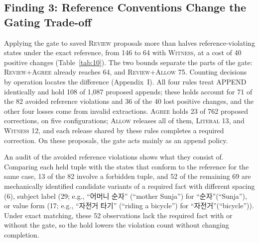 \documentclass[acmsmall,review,anonymous]{acmart}
\newcommand{\agree}{\textsc{Agree}}
\newcommand{\allow}{\textsc{Allow}}
\newcommand{\literal}{\textsc{Literal}}
\newcommand{\witness}{\textsc{Witness}}
\newcommand{\review}{\textsc{Review}}
\begin{document}
\subsection{Finding 3: Reference Conventions Change the Gating Trade-off}\label{sec:reference-results}
Applying the gate to saved \review{} proposals more than halves reference-violating states under the exact reference, from 146 to 64 with \witness{}, at a cost of 40 positive changes (Table~\ref{tab:10}). The two bounds separate the parts of the gate: \review{}+\agree{} already reaches 64, and \review{}+\allow{} 75. Counting decisions by operation locates the difference (Appendix~I). All four rules treat APPEND identically and hold 108 of 1,087 proposed appends; these holds account for 71 of the 82 avoided reference violations and 36 of the 40 lost positive changes, and the other four losses come from invalid extractions. \agree{} holds 23 of 762 proposed corrections, on five configurations; \allow{} releases all of them, \literal{} 13, and \witness{} 12, and each release shared by these rules completes a required correction. On these proposals, the gate acts mainly as an append policy.

An audit of the avoided reference violations shows what they consist of. Comparing each held tuple with the states that conform to the reference for the same case, 13 of the 82 involve a forbidden tuple, and 52 of the remaining 69 are mechanically identified candidate variants of a required fact with different spacing (6), subject label (29; e.g., ``어머니 순자'' (``mother Sunja'') for ``순자''(``Sunja''), or value form (17; e.g., ``자전거 타기'' (``riding a bicycle'') for ``자전거''(``bicycle'')). Under exact matching, these 52 observations lack the required fact with or without the gate, so the hold lowers the violation count without changing completion.
\end{document}
